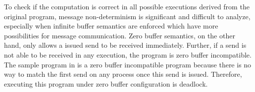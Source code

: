 To check if the computation is correct in all possible executions derived from the original program, message non-determinism is significant and difficult to analyze, especially when infinite buffer semantics are enforced which have more possibilities for message communication. Zero buffer semantics, on the other hand, only allows a issued send to be received immediately. Further, if a send is not able to be received in any execution, the program is zero buffer incompatible. The sample program in  is a zero buffer incompatible program because there is no way to match the first send on any process once this send is issued. Therefore, executing this program under zero buffer configuration is deadlock. 



